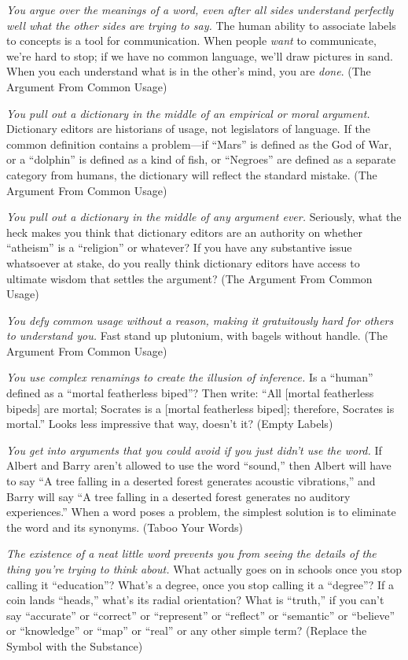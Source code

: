 {
 \textit{You argue over the meanings of a word, even after all
sides understand perfectly well what the other sides are trying to
say.} The human ability to associate labels to concepts is a tool for
communication. When people \textit{want} to communicate,
we're hard to stop; if we have no common language,
we'll draw pictures in sand. When you each understand
what is in the other's mind, you are \textit{done}.
(The Argument From Common Usage)}

{
 \textit{You pull out a dictionary in the middle of an empirical or
moral argument.} Dictionary editors are historians of usage, not
legislators of language. If the common definition contains a
problem---if ``Mars'' is defined as
the God of War, or a ``dolphin'' is
defined as a kind of fish, or
``Negroes'' are defined as a
separate category from humans, the dictionary will reflect the standard
mistake. (The Argument From Common Usage)}

{
 \textit{You pull out a dictionary in the middle of any argument
ever.} Seriously, what the heck makes you think that dictionary editors
are an authority on whether
``atheism'' is a
``religion'' or whatever? If you
have any substantive issue whatsoever at stake, do you really think
dictionary editors have access to ultimate wisdom that settles the
argument? (The Argument From Common Usage)}

{
 \textit{You defy common usage without a reason, making it
gratuitously hard for others to understand you.} Fast stand up
plutonium, with bagels without handle. (The Argument From Common
Usage)}

{
 \textit{You use complex renamings to create the illusion of
inference.} Is a ``human'' defined
as a ``mortal featherless biped''?
Then write: ``All [mortal featherless bipeds] are
mortal; Socrates is a [mortal featherless biped]; therefore, Socrates
is mortal.'' Looks less impressive that way,
doesn't it? (Empty Labels)}

{
 \textit{You get into arguments that you could avoid if you just
didn't use the word.} If Albert and Barry
aren't allowed to use the word
``sound,'' then Albert will have to
say ``A tree falling in a deserted forest generates
acoustic vibrations,'' and Barry will say
``A tree falling in a deserted forest generates no
auditory experiences.'' When a word poses a problem,
the simplest solution is to eliminate the word and its synonyms. (Taboo
Your Words)}

{
 \textit{The existence of a neat little word prevents you from
seeing the details of the thing you're trying to think
about.} What actually goes on in schools once you stop calling it
``education''?
What's a degree, once you stop calling it a
``degree''? If a coin lands
``heads,'' what's
its radial orientation? What is
``truth,'' if you
can't say
``accurate'' or
``correct'' or
``represent'' or
``reflect'' or
``semantic'' or
``believe'' or
``knowledge'' or
``map'' or
``real'' or any other simple term?
(Replace the Symbol with the Substance)}

